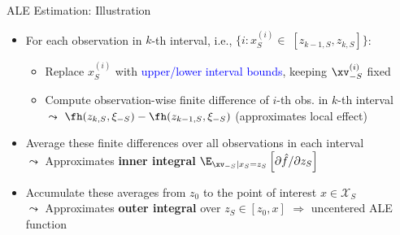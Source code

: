 \documentclass[11pt,compress,t,notes=noshow, aspectratio=169, xcolor=table]{beamer}
\begin{document}
\begin{frame}{ALE Estimation: Illustration}
\begin{itemize}
\tightlist
\item<1-> For each observation in $k$-th interval, i.e., $\{i: x_S^{(i)} \in \; [z_{k-1, S}, z_{k, S}]\}$:
  \begin{itemize}
    \item Replace $x_S^{(i)}$ with \textcolor{blue}{upper/lower interval bounds}, keeping $\xv_{-S}^{(i)}$ fixed
    \item Compute observation-wise finite difference of $i$-th obs. in $k$-th interval \\
    $\leadsto$ $\fh(z_{k, S}, \xi_{-S}) - \fh(z_{k-1, S}, \xi_{-S})$  \; (approximates local effect)  %
  \end{itemize}
\item<2-> Average these finite differences over all observations in each interval \\
$\leadsto$ Approximates \textbf{inner integral} \textcolor{red}{\( \E_{\xv_{-S} \mid x_S = z_S} \left[ \partial \hat{f}/\partial z_S \right] \)}
\item<2-> Accumulate these averages from \( z_0 \) to the point of interest \( x \in \mathcal{X}_S \) \\
$\leadsto$ Approximates \textbf{outer integral} over \( z_S \in [z_{0}, x] \) $\Rightarrow$ uncentered ALE function

\end{itemize}

\end{frame}



\end{document}
